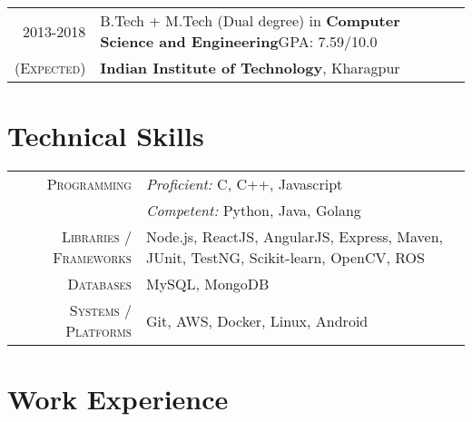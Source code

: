 \documentclass[a4paper,10pt]{extarticle} %
\begin{document}
\begin{tabular}{r|p{17.5cm}}	
2013-2018 & B.Tech + M.Tech (Dual degree) in \textbf{Computer Science and Engineering}\hfill\textsc{GPA}: 7.59/10.0\\
\textsc{(Expected)}&\textbf{Indian Institute of Technology}, Kharagpur\\
\end{tabular}


\section{\textcolor{primary}{Technical Skills}}

\begin{tabular}{r|p{15cm}}
\textsc{Programming} & \textit{Proficient:} C, C++, Javascript\\
& \textit{Competent:} Python, Java, Golang \\
\textsc{Libraries / Frameworks} & Node.js, ReactJS, AngularJS, Express, Maven, JUnit, TestNG, Scikit-learn, OpenCV, ROS\\
\textsc{Databases} & MySQL, MongoDB\\
\textsc{Systems / Platforms} & Git, AWS, Docker, Linux, Android\\
\end{tabular}

\section{\textcolor{primary}{Work Experience}}
\end{document}
